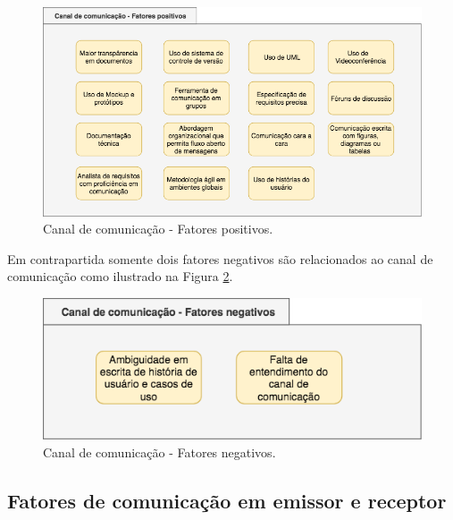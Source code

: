 \begin{figure}[h!] %
    \caption{Canal de comunicação - Fatores positivos.}
	\begin{center}
	    \includegraphics[scale=0.6]{figuras/quadro1} %
	\end{center}
	\label{fig:quadro1}
\end{figure}


Em contrapartida somente dois fatores negativos são relacionados ao canal de comunicação como ilustrado na Figura \ref{fig:quadro2}.
\newpage
\begin{figure}[h!] %
\caption{Canal de comunicação - Fatores negativos.}
	\begin{center}
	    \includegraphics[scale=0.6]{figuras/quadro2} %
	\end{center}
	\label{fig:quadro2}
\end{figure}

\subsection{Fatores de comunicação em emissor e receptor}

